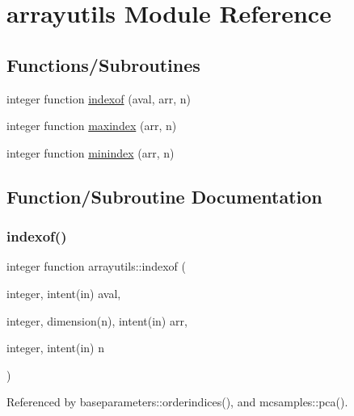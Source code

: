 \hypertarget{namespacearrayutils}{}\section{arrayutils Module Reference}
\label{namespacearrayutils}
\subsection*{Functions/\+Subroutines}
\begin{DoxyCompactItemize}
\item 
integer function \mbox{\hyperlink{namespacearrayutils_aa1aa3daae226441732e2e7c4f292eab2}{indexof}} (aval, arr, n)
\item 
integer function \mbox{\hyperlink{namespacearrayutils_ad2c5184ac408d5a352ea420ff3f1e1eb}{maxindex}} (arr, n)
\item 
integer function \mbox{\hyperlink{namespacearrayutils_aba5bf237d7739646abd0596fea043455}{minindex}} (arr, n)
\end{DoxyCompactItemize}


\subsection{Function/\+Subroutine Documentation}
\mbox{\label{namespacearrayutils_aa1aa3daae226441732e2e7c4f292eab2}} 
\subsubsection{\texorpdfstring{indexof()}{indexof()}}
{\footnotesize\ttfamily integer function arrayutils\+::indexof (\begin{DoxyParamCaption}\item[{integer, intent(in)}]{aval,  }\item[{integer, dimension(n), intent(in)}]{arr,  }\item[{integer, intent(in)}]{n }\end{DoxyParamCaption})}



Referenced by baseparameters\+::orderindices(), and mcsamples\+::pca().

